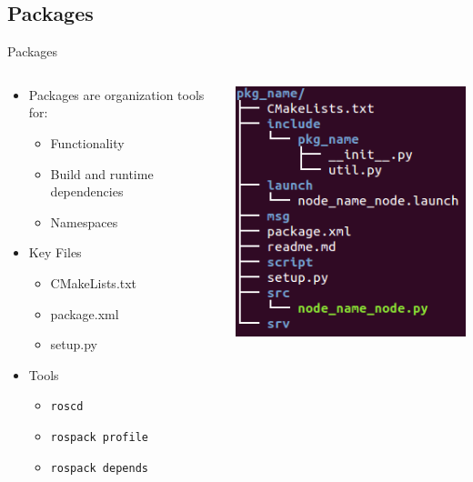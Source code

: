 \documentclass{beamer}
\begin{document}
\subsection{Packages}
\begin{frame}{Packages}
\begin{columns}
	\begin{column}{0.6\textwidth}
		\begin{itemize}
			\item Packages are organization tools for:
			\begin{itemize}
				\item Functionality
				\item Build and runtime dependencies
				\item Namespaces
			\end{itemize}
			\item Key Files
				\begin{itemize}
					\item CMakeLists.txt
					\item package.xml
					\item setup.py
				\end{itemize}
			\item Tools
				\begin{itemize}
					\item \texttt{roscd}
					\item \texttt{rospack profile}
					\item \texttt{rospack depends}
				\end{itemize}
		\end{itemize}
	\end{column}
	\begin{column}{0.4\textwidth}
		\centering
		\includegraphics[width=\textwidth]{fig/pkg_tree.png}
	\end{column}
\end{columns}
\end{frame}
\end{document}
